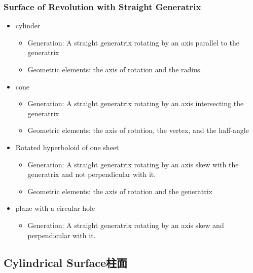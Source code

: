 \documentclass[onecolumn]{ctexart}
\begin{document}
\subsubsection{Surface of Revolution with Straight Generatrix}
\begin{itemize}
  \item cylinder
  \begin{itemize}
    \item Generation: A straight generatrix rotating by an axis parallel to the generatrix
    \item Geometric elements: the axis of rotation and the radius.
  \end{itemize}
  \item cone
  \begin{itemize}
    \item Generation: A straight generatrix rotating by an axis intersecting the generatrix
    \item Geometric elements: the axis of rotation, the vertex, and the half-angle
  \end{itemize}
  \item Rotated hyperboloid of one sheet
  \begin{itemize}
    \item Generation: A straight generatrix rotating by an axis skew with the generatrix and not perpendicular with it.
    \item Geometric elements: the axis of rotation and the generatrix
  \end{itemize}
  \item plane with a circular hole
  \begin{itemize}
    \item Generation: A straight generatrix rotating by an axis skew and perpendicular with it.
  \end{itemize}
\end{itemize}

\subsection{Cylindrical Surface柱面}
\end{document}
